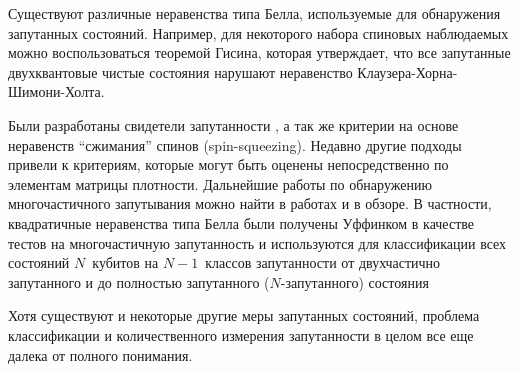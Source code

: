 Существуют различные неравенства типа Белла, используемые для обнаружения запутанных состояний\cite{Collins2002, Seevinck2001, Toth2005, Nagata2002, Yu2003, Laskowski2005, Schmid2008, Bancal2009, Svetlichny1987, Gisin1998}.
Например, для некоторого набора спиновых наблюдаемых можно воспользоваться теоремой Гисина\cite{Gisin1991}, 
которая утверждает, что 
все запутанные двухквантовые чистые состояния нарушают неравенство Клаузера-Хорна-Шимони-Холта\cite{Clauser1969}. 

Были разработаны свидетели запутанности \cite{Wootters1998, Bourennane2004, Kaszlikowski2008, Krammer2009, Bancal2011},  
%
а так же критерии на основе неравенств ``сжимания'' спинов (spin-squeezing)\cite{Sorensen2001, Durkin2005, Vitagliano2011, Duan2011}. 
Недавно другие подходы привели к критериям, которые могут быть оценены непосредственно по элементам матрицы плотности\cite{Guhne2010, Huber2010}. 
Дальнейшие работы по обнаружению многочастичного запутывания можно найти в работах\cite{Li2010, Jungnitsch2011, Vicente2011, Huber2011} и в обзоре\cite{Guhne2009}.
В частности, квадратичные неравенства типа Белла были получены Уффинком\cite{Uffink2002} в качестве тестов на многочастичную запутанность 
и используются для классификации всех состояний $N$~кубитов на $N-1$~классов запутанности от двухчастично запутанного и до полностью запутанного 
 ($N$-запутанного) состояния\cite{Yu2003}
 
Хотя существуют и некоторые другие меры запутанных состояний\cite{Guhne2009}, проблема классификации и количественного измерения
запутанности в целом все еще далека от полного
понимания.

% 






